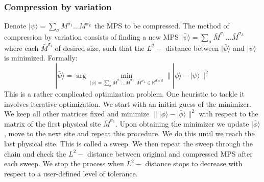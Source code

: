 \documentclass[english]{article}
\begin{document}
\subsubsection{Compression by variation}
Denote $|\psi\rangle=\sum_{\sigma}M^{\sigma_1}\dots M^{\sigma_L}$ the MPS to be compressed. The method of compression by variation consists of finding a new MPS $|\bar\psi\rangle=\sum_{\sigma}\bar M^{\sigma_1}\dots 
 \bar M^{\sigma_L}$ where each $\bar M^{\sigma_i}$ of desired size, such that the $L^2-$ distance between $|\bar\psi\rangle$ and $|\psi\rangle$ is minimized. Formally:
 \[
|\bar\psi\rangle = \arg\min_{|\phi\rangle=\sum_{\sigma}\bar M^{\sigma_1}\dots 
 \bar M^{\sigma_L}, M^{\sigma_L} \in \mathbb{R}^{d\times d} }\||\phi \rangle-|\psi\rangle\|^2
 \]
 This is a rather complicated optimization problem. One heuristic to tackle it involves iterative optimization. We start with an initial guess of the minimizer. We keep all other matrices fixed and minimize $\||\phi \rangle-|\bar\phi\rangle\|^2$ with respect to the matrix of the first physical site $\bar M^{\sigma_1}$. Upon obtaining the minimizer we update $|\bar\phi\rangle$, move to the next site and repeat this procedure. We do this until we reach the last physical site. This is called a sweep. We then repeat the sweep through the chain and check the $L^2-$ distance between original and compressed MPS after each sweep. We stop the process when $L^2-$ distance stops to decrease with respect to a user-defined level of tolerance.
\end{document}
